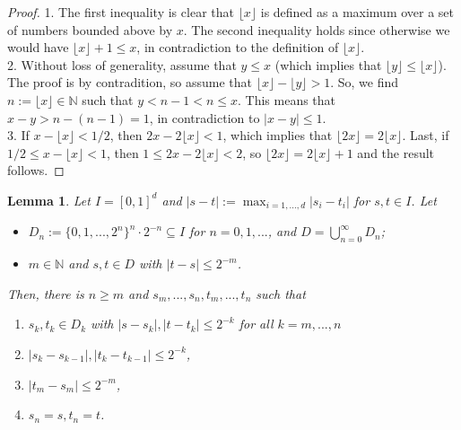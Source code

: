 \documentclass{article}
\newtheorem{lemma}[proposition]{Lemma}
\theoremstyle{definition}
\theoremstyle{step} \newtheorem{step}{Step}
\begin{document}
\begin{proof}
  1. The first inequality is clear that $\lfloor x\rfloor$ is defined
  as a maximum over a set of numbers bounded above by $x$. The second
  inequality holds since otherwise we would have $\lfloor x\rfloor + 1
    \leq x$, in contradiction to the definition of $\lfloor
    x\rfloor$. \\ 2. Without loss of generality, assume that $y\leq x$
  (which implies that $\lfloor y \rfloor \leq \lfloor x\rfloor$). The
  proof is by contradition, so assume that $\lfloor x\rfloor - \lfloor
    y \rfloor > 1$. So, we find $n := \lfloor x\rfloor\in\mathbb N$ such
  that $y < n-1 < n \leq x$. This means that $x-y > n - (n-1) = 1$, in
  contradiction to $|x-y| \leq 1$.  \\ 3.  If $x - \lfloor x\rfloor <
    1/2$, then $2x - 2 \lfloor x\rfloor < 1$, which implies that
  $\lfloor 2x\rfloor = 2\lfloor x\rfloor$. Last, if $1/2 \leq x -
    \lfloor x\rfloor < 1$, then $1 \leq 2x - 2\lfloor x\rfloor < 2$, so
  $\lfloor 2x\rfloor = 2\lfloor x\rfloor +1$ and the result follows.
\end{proof}


\begin{lemma}
  Let $I = [0,1]^d$ and $|s-t| := \max_{i=1,...,d} |s_i - t_i|$ for
  $s,t\in I$. Let
  \begin{itemize}
    \item $D_n := \{0,1,...,2^n\}^n \cdot 2^{-n} \subseteq I$ for
          $n=0,1,...$, and $D =\bigcup_{n=0}^\infty D_n$;
    \item $m \in \mathbb N$ and $s,t \in D$ with $|t-s| \leq 2^{-m}$.
  \end{itemize}
  Then, there is $n \geq m$ and $s_m,...,s_n, t_m,...,t_n$ such that
  \begin{enumerate}
    \item $s_k, t_k \in D_k$ with $|s-s_k|, |t-t_k| \leq 2^{-k}$ for all
          $k=m,...,n$
    \item $|s_k - s_{k-1}|, |t_k - t_{k-1}| \leq 2^{-k}$,
    \item $|t_m - s_m| \leq 2^{-m}$,
    \item $s_n=s, t_n=t$.
  \end{enumerate}
\end{lemma}
\end{document}
